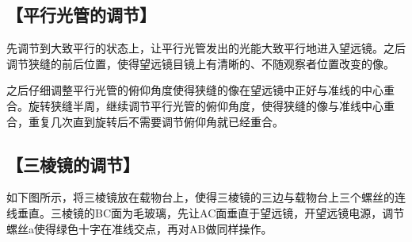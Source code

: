 \documentclass{ctexart}
\let\oldsubsection\subsection
\renewcommand{\subsection}[1]{\oldsubsection{\!\!\!\!\!\!【#1】}}
\begin{document}
\subsection{平行光管的调节}

先调节到大致平行的状态上，让平行光管发出的光能大致平行地进入望远镜。之后调节狭缝的前后位置，使得望远镜目镜上有清晰的、不随观察者位置改变的像。

之后仔细调整平行光管的俯仰角度使得狭缝的像在望远镜中正好与准线的中心重合。旋转狭缝半周，继续调节平行光管的俯仰角度，使得狭缝的像与准线中心重合，重复几次直到旋转后不需要调节俯仰角就已经重合。

\subsection{三棱镜的调节}

  如下图所示，将三棱镜放在载物台上，使得三棱镜的三边与载物台上三个螺丝的连线垂直。三棱镜的BC面为毛玻璃，先让AC面垂直于望远镜，开望远镜电源，调节螺丝a使得绿色十字在准线交点，再对AB做同样操作。
\end{document}
